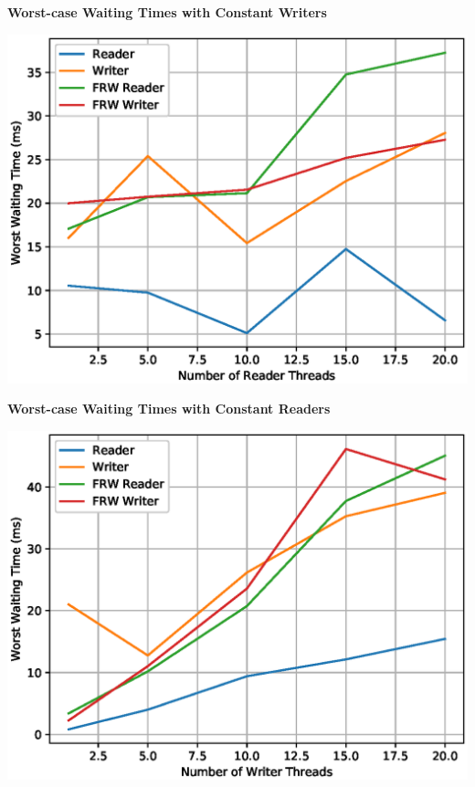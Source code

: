 \documentclass[a4paper,12pt]{report}
\begin{document}
\begin{center}
\newpage
\begin{large}
\textbf{Worst-case Waiting Times with Constant Writers}\\
\end{large}
\includegraphics[scale=0.7]{./ConstantWriters-WorstTimes.eps}
\end{center}
\begin{center}
\begin{large}
\textbf{Worst-case Waiting Times with Constant Readers}\\
\end{large}
\includegraphics[scale=0.7]{./ConstantReaders-WorstTimes.eps}
\end{center}
\newpage
\end{document}
